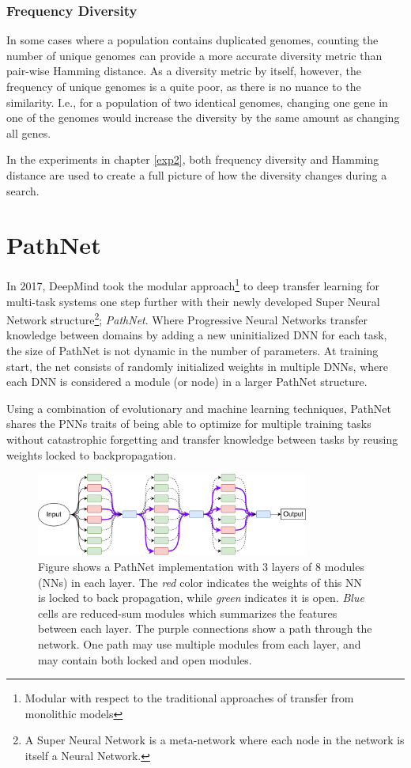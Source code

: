 \subsubsection{Frequency Diversity}
In some cases where a population contains duplicated genomes, counting the number of unique genomes can provide a more accurate diversity metric than pair-wise Hamming distance. As a diversity metric by itself, however, the frequency of unique genomes is a quite poor, as there is no nuance to the similarity. I.e., for a population of two identical genomes, changing one gene in one of the genomes would increase the diversity by the same amount as changing all genes. 

In the experiments in chapter \ref{exp2}, both frequency diversity and Hamming distance are used to create a full picture of how the diversity changes during a search.

\section{PathNet}
\label{background:pn}
In 2017, DeepMind took the modular approach\footnote{Modular with respect to the traditional approaches of transfer from monolithic models} to deep transfer learning for multi-task systems one step further with their newly developed Super Neural Network structure\footnote{A Super Neural Network is a meta-network where each node in the network is itself a Neural Network.}; \textit{PathNet}\cite{pathnet}. Where Progressive Neural Networks transfer knowledge between domains by adding a new uninitialized DNN for each task, the size of PathNet is not dynamic in the number of parameters. At training start, the net consists of randomly initialized weights in multiple DNNs, where each DNN is considered a module (or node) in a larger PathNet structure. 

Using a combination of evolutionary and machine learning techniques, PathNet shares the PNNs traits of being able to optimize for multiple training tasks without catastrophic forgetting and transfer knowledge between tasks by reusing weights locked to backpropagation.  
\begin{figure}[h]
    \centering
    \includegraphics[width=0.8\textwidth]{Chapters/2.Background/figures/PathNet.pdf}
    \caption[PathNet structure]{Figure shows a PathNet implementation with 3 layers of 8 modules (NNs) in each layer. The \textit{red} color indicates the weights of this NN is locked to back propagation, while \textit{green} indicates it is open. \textit{Blue} cells are reduced-sum modules which summarizes the features between each layer. The purple connections show a path through the network. One path may use multiple modules from each layer, and may contain both locked and open modules.}
    \label{fig:pathnet}
\end{figure}

